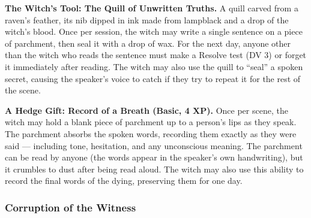 \textbf{The Witch's Tool: The Quill of Unwritten Truths.} A quill carved from a raven's feather, its nib dipped in ink made from lampblack and a drop of the witch's blood. Once per session, the witch may write a single sentence on a piece of parchment, then seal it with a drop of wax. For the next day, anyone other than the witch who reads the sentence must make a Resolve test (DV 3) or forget it immediately after reading. The witch may also use the quill to ``seal'' a spoken secret, causing the speaker's voice to catch if they try to repeat it for the rest of the scene.

\textbf{A Hedge Gift: Record of a Breath (Basic, 4 XP).} Once per scene, the witch may hold a blank piece of parchment up to a person's lips as they speak. The parchment absorbs the spoken words, recording them exactly as they were said --- including tone, hesitation, and any unconscious meaning. The parchment can be read by anyone (the words appear in the speaker's own handwriting), but it crumbles to dust after being read aloud. The witch may also use this ability to record the final words of the dying, preserving them for one day.

\subsubsection*{Corruption of the Witness}

